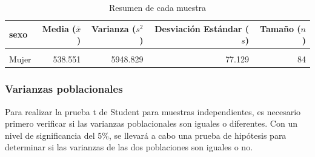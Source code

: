 \documentclass[
]{article}
\newenvironment{Shaded}{\begin{snugshade}}{\end{snugshade}}
\newcommand{\DecValTok}[1]{\textcolor[rgb]{0.00,0.00,0.81}{#1}}
\newcommand{\FunctionTok}[1]{\textcolor[rgb]{0.13,0.29,0.53}{\textbf{#1}}}
\newcommand{\NormalTok}[1]{#1}
\newcommand{\OtherTok}[1]{\textcolor[rgb]{0.56,0.35,0.01}{#1}}
\newcommand{\SpecialCharTok}[1]{\textcolor[rgb]{0.81,0.36,0.00}{\textbf{#1}}}
\newcommand{\StringTok}[1]{\textcolor[rgb]{0.31,0.60,0.02}{#1}}
\begin{document}
\begin{Shaded}
\end{Shaded}

\begin{table}[!h]
\centering
\caption{\label{tab:tabla}Resumen de cada muestra}
\centering
\begin{tabular}[t]{lrrrr}
\toprule
sexo & Media (\(\bar{x}\)) & Varianza (\(s^{2}\)) & Desviación Estándar (\(s\)) & Tamaño (\(n\))\\
\midrule
\cellcolor{gray!10}{Hombre} & \cellcolor{gray!10}{553.216} & \cellcolor{gray!10}{5884.149} & \cellcolor{gray!10}{76.708} & \cellcolor{gray!10}{76}\\
Mujer & 538.551 & 5948.829 & 77.129 & 84\\
\bottomrule
\end{tabular}
\end{table}

\subsubsection*{Varianzas poblacionales}\label{varianzas-poblacionales}

Para realizar la prueba t de Student para muestras independientes, es
necesario primero verificar si las varianzas poblacionales son iguales o
diferentes. Con un nivel de significancia del 5\%, se llevará a cabo una
prueba de hipótesis para determinar si las varianzas de las dos
poblaciones son iguales o no.
\end{document}
